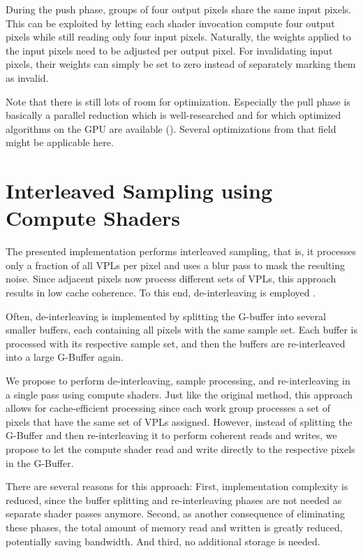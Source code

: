 During the push phase, groups of four output pixels share the same input pixels. This can be exploited by letting each shader invocation compute four output pixels while still reading only four input pixels. Naturally, the weights applied to the input pixels need to be adjusted per output pixel. For invalidating input pixels, their weights can simply be set to zero instead of separately marking them as invalid.

Note that there is still lots of room for optimization. Especially the pull phase is basically a parallel reduction which is well-researched and for which optimized algorithms on the GPU are available (\cite{Harris:2007:ParallelReduction}). Several optimizations from that field might be applicable here.



\section{Interleaved Sampling using Compute Shaders}
\label{sec:impl:interleavedShading}

The presented implementation performs interleaved sampling, that is, it processes only a fraction of all VPLs per pixel and uses a blur pass to mask the resulting noise. Since adjacent pixels now process different sets of VPLs, this approach results in low cache coherence. To this end, de-interleaving is employed \citep{segovia2006non}.

Often, de-interleaving is implemented by splitting the G-buffer into several smaller buffers, each containing all pixels with the same sample set. Each buffer is processed with its respective sample set, and then the buffers are re-interleaved into a large G-Buffer again.

We propose to perform de-interleaving, sample processing, and re-interleaving in a single pass using compute shaders. Just like the original method, this approach allows for cache-efficient processing since each work group processes a set of pixels that have the same set of VPLs assigned. However, instead of splitting the G-Buffer and then re-interleaving it to perform coherent reads and writes, we propose to let the compute shader read and write directly to the respective pixels in the G-Buffer.

There are several reasons for this approach: First, implementation complexity is reduced, since the buffer splitting and re-interleaving phases are not needed as separate shader passes anymore. Second, as another consequence of eliminating these phases, the total amount of memory read and written is greatly reduced, potentially saving bandwidth. And third, no additional storage is needed.

